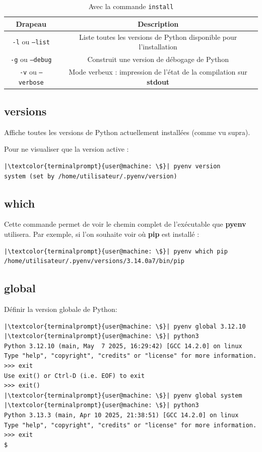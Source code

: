\begin{table}[h!]
\centering
\begin{tabular}{|c|c|} %
\hline
    \textbf{Drapeau} & \textbf{Description} \\ \hline
    \texttt{-l} ou \texttt{--list} & Liste toutes les versions de Python disponible pour l'installation \\ \hline
    \texttt{-g} ou \texttt{--debug} & Construit une version de débogage de Python \\ \hline
    \texttt{-v} ou \texttt{--verbose} & Mode verbeux : impression de l'état de la compilation sur \textbf{stdout} \\ \hline
\end{tabular}
    \caption{Avec la commande \texttt{install}}
\end{table}

\subsection*{versions}
Affiche toutes les versions de Python actuellement installées (comme vu supra).

Pour ne visualiser que la version active :
\begin{lstlisting}[style=terminal]
|\textcolor{terminalprompt}{user@machine: \$}| pyenv version
system (set by /home/utilisateur/.pyenv/version)
\end{lstlisting}

\subsection*{which}
Cette commande permet de voir le chemin complet de l'exécutable que \textbf{pyenv} utilisera. Par exemple, si l'on souhaite voir où \textbf{pip} est installé :
\begin{lstlisting}[style=terminal]
|\textcolor{terminalprompt}{user@machine: \$}| pyenv which pip
/home/utilisateur/.pyenv/versions/3.14.0a7/bin/pip
\end{lstlisting}

\subsection*{global}
Définir la version globale de Python:
\begin{lstlisting}[style=terminal]
|\textcolor{terminalprompt}{user@machine: \$}| pyenv global 3.12.10
|\textcolor{terminalprompt}{user@machine: \$}| python3
Python 3.12.10 (main, May  7 2025, 16:29:42) [GCC 14.2.0] on linux
Type "help", "copyright", "credits" or "license" for more information.
>>> exit
Use exit() or Ctrl-D (i.e. EOF) to exit
>>> exit()
|\textcolor{terminalprompt}{user@machine: \$}| pyenv global system
|\textcolor{terminalprompt}{user@machine: \$}| python3
Python 3.13.3 (main, Apr 10 2025, 21:38:51) [GCC 14.2.0] on linux
Type "help", "copyright", "credits" or "license" for more information.
>>> exit
$
\end{lstlisting}

